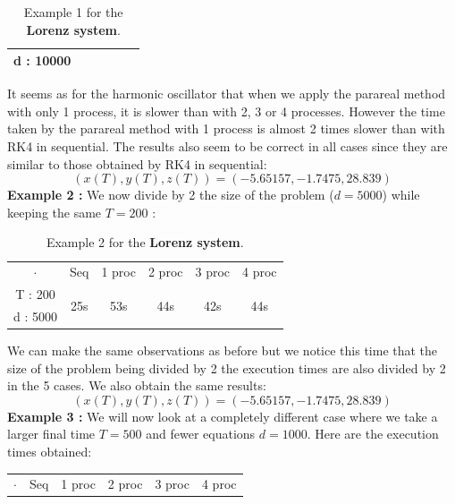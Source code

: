 \begin{enumerate}[label=\textbullet]
\begin{itemize}[label=-]
\begin{table}[H]
\begin{tabular}{| c || c | c | c | c | c |}
				d : 10000 & & & & & \\
				\hline 
			\end{tabular}
			\caption{Example 1 for the \textbf{Lorenz system}.}
			\label{time_lorenz_1}
		\end{table}
		It seems as for the harmonic oscillator that when we apply the parareal method with only 1 process, it is slower than with 2, 3 or 4 processes. However the time taken by the parareal method with 1 process is almost 2 times slower than with RK4 in sequential. The results also seem to be correct in all cases since they are similar to those obtained by RK4 in sequential:
		$$(x(T),y(T),z(T))=(-5.65157, -1.7475, 28.839)$$
		\textbf{Example 2 :} We now divide by 2 the size of the problem ($d=5000$) while keeping the same $T=200$ :
		\begin{table}[H]
			\centering
			\begin{tabular}{| c || c | c | c | c | c |}
				\hline
				\multirow{2}{1.5 cm}{$\cdot$} & \multirow{2}{1.5 cm}{Seq} & \multirow{2}{1.5 cm}{1 proc} & \multirow{2}{1.5 cm}{2 proc} & \multirow{2}{1.5 cm}{3 proc} &\multirow{2}{1.5 cm}{4 proc} \\
				& & & & & \\
				\hline  
				T : 200 & \multirow{2}{1.5 cm}{25s} & \multirow{2}{1.5 cm}{53s} & \multirow{2}{1.5 cm}{44s} & \multirow{2}{1.5 cm}{42s} & \multirow{2}{1.5 cm}{44s} \\
				d : 5000 & & & & & \\
				\hline 
			\end{tabular}
			\caption{Example 2 for the \textbf{Lorenz system}.}
			\label{time_lorenz_2}
		\end{table}
		We can make the same observations as before but we notice this time that the size of the problem being divided by 2 the execution times are also divided by 2 in the 5 cases. We also obtain the same results:
		$$(x(T),y(T),z(T))=(-5.65157, -1.7475, 28.839)$$
		\textbf{Example 3 :} We will now look at a completely different case where we take a larger final time $T=500$ and fewer equations $d=1000$. Here are the execution times obtained:
		\begin{table}[H]
			\centering
			\begin{tabular}{| c || c | c | c | c | c |}
				\hline
				\multirow{2}{1.5 cm}{$\cdot$} & \multirow{2}{1.5 cm}{Seq} & \multirow{2}{1.5 cm}{1 proc} & \multirow{2}{1.5 cm}{2 proc} & \multirow{2}{1.5 cm}{3 proc} &\multirow{2}{1.5 cm}{4 proc} \\
				& & & & & \\

\end{tabular}
\end{table}
\end{itemize}
\end{enumerate}
